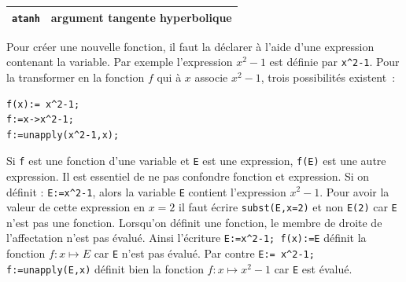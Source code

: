 \documentclass{article}
\begin{document}
\begin{giacjshere}
\begin{center}
\begin{tabular}{|ll|}
\verb|atanh| & argument tangente hyperbolique\\
\hline
\end{tabular}
\end{center}
Pour cr\'eer une nouvelle fonction, il faut la d\'eclarer \`a l'aide 
d'une expression contenant la variable. 
Par exemple l'expression $x^2-1$ est 
d\'efinie par \verb|x^2-1|. Pour la transformer en la fonction $f$ qui
\`a $x$ associe $x^2-1$, trois possibilit\'es existent~:
\begin{verbatim}
f(x):= x^2-1;
f:=x->x^2-1;
f:=unapply(x^2-1,x);
\end{verbatim}

Si \verb|f| est une fonction d'une variable et \verb|E| est une
expression, \verb|f(E)| est une autre expression.
Il est essentiel de ne pas confondre fonction et expression.
Si on d\'efinit : \verb|E:=x^2-1|, alors la variable \verb|E| 
contient l'expression $x^2-1$. Pour avoir la valeur de cette
expression en $x=2$ il faut 
\'ecrire \verb|subst(E,x=2)| et non \verb|E(2)|
car \verb|E| n'est pas une fonction.
Lorsqu'on d\'efinit une fonction,
le membre de droite de l'affectation n'est pas \'evalu\'e.
Ainsi l'\'ecriture \verb|E:=x^2-1; f(x):=E|
d\'efinit la fonction $f: x \mapsto E$ car \verb|E| n'est pas \'evalu\'e.
Par contre \verb|E:= x^2-1; f:=unapply(E,x)| d\'efinit bien la
fonction $f: x\mapsto x^2-1$ car \verb|E| est \'evalu\'e.


\end{giacjshere}
\end{document}
